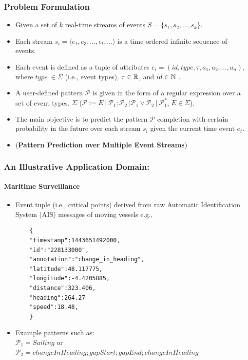 \frame
{
	\frametitle{Problem Formulation}
	
	\begin{itemize}[]
		\item<only@1>Given a set of $k$ real-time streams of events $S = \{ s_1,s_2, ..., s_k\}$.
		
		\item<only@1> Each stream  $s_i=\langle e_1,e_3,...,e_t,...\rangle$  is a time-ordered infinite sequence of events.
		
		\item<only@1> Each event is defined as a tuple of attributes $e_i = (id,type,\tau,a_1,a_2,\ldots,a_n)$, where $type\ \in  \Sigma$ (i.e., event types), $\tau\in\mathbb{R}$, and  $id\in\mathbb{N}$ . 
		\item<only@1> A user-defined pattern $\mathcal{P}$ is given in the form of a regular expression over a set of event types. $\Sigma$ ($\mathcal{P} := E\ |\ \mathcal{P}_{1} ; \mathcal{P}_{2}\ | \mathcal{P}_{1} \vee \mathcal{P}_{2}\ |\ \mathcal{P}_{1}^{*}$,  $E \in \Sigma$).
		
		
		\item<2->The main objective is to predict the pattern $\mathcal{P}$ completion with certain probability in the future over each stream $s_i$ given the current time event $e_t$. 
		
		\item<3-> (\textbf{Pattern Prediction over Multiple Event Streams})
	\end{itemize}
}

\begin{frame}[fragile]

	\frametitle{An Illustrative Application Domain:}
    \framesubtitle{Maritime Surveillance}
	\begin{itemize}
		\item<only@1> Event tuple (i.e., critical points) derived from raw Automatic Identification System (AIS) messages of moving vessels e.g., 
		\begin{verbatim}
	{
	"timestamp":1443651492000,
	"id":"228133000",
	"annotation":"change_in_heading",
	"latitude":48.117775,
	"longitude":-4.4205885,
	"distance":323.406,
	"heading":264.27
	"speed":18.48,
	}
	\end{verbatim}
	
		\item<only@1> Example patterns such as:\\
 	   $\mathcal{P}_1=Sailing$ or\\ 
 	   $\mathcal{P}_2=changeInHeading; gapStart; gapEnd; changeInHeading$
	\end{itemize}
\end{frame}


